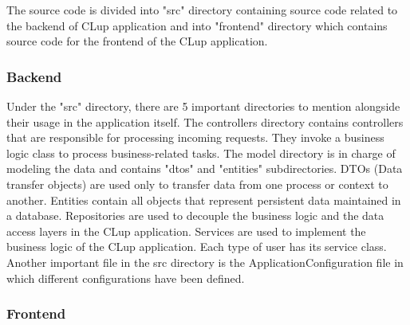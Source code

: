 The source code is divided into "src" directory containing source code related to the backend of CLup application and into "frontend" directory
which contains source code for the frontend of the CLup application.

\subsubsection{Backend}
Under the "src" directory, there are 5 important directories to mention alongside their usage in the application itself.
The controllers directory contains controllers that are responsible for processing incoming requests.
They invoke a business logic class to process business-related tasks.
The model directory is in charge of modeling the data and contains "dtos" and "entities" subdirectories.
DTOs (Data transfer objects) are used only to transfer data from one process or context to another.
Entities contain all objects that represent persistent data maintained in a database.
Repositories are used to decouple the business logic and the data access layers in the CLup application.
Services are used to implement the business logic of the CLup application. Each type of user has its service class.
Another important file in the src directory is the ApplicationConfiguration file in which different configurations have been defined.

\subsubsection{Frontend}





